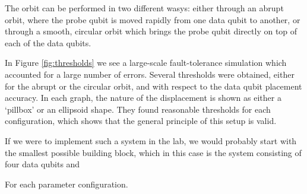 The orbit can be performed in two different wasys: either through an abrupt orbit, where the probe qubit is moved rapidly from one data qubit to another, or through a smooth, circular orbit which brings the probe qubit directly on top of each of the data qubits. 

In Figure \ref{fig:thresholds} we see a large-scale fault-tolerance simulation which accounted for a large number of errors. Several thresholds were obtained, either for the abrupt or the circular orbit, and with respect to the data qubit placement accuracy. In each graph, the nature of the displacement is shown as either a `pillbox' or an ellipsoid shape. They found reasonable thresholds for each configuration, which shows that the general principle of this setup is valid. 

If we were to implement such a system in the lab, we would probably start with the smallest possible building block, which in this case is the system consisting of four data qubits and 

For each parameter configuration. 

